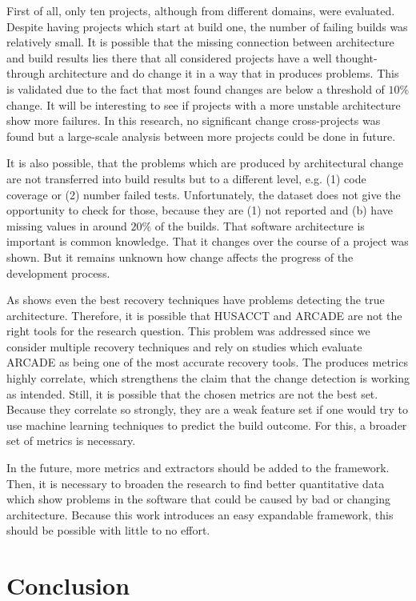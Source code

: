 \documentclass[conference]{IEEEtran}
\begin{document}
First of all, only ten projects, although from different domains, were evaluated. Despite having projects which start at build one, the number of failing builds was relatively small. It is possible that the missing connection between architecture and build results lies there that all considered projects have a well thought-through architecture and do change it in a way that in produces problems. This is validated due to the fact that most found changes are below a threshold of $10\%$ change. It will be interesting to see if projects with a more unstable architecture show more failures. In this research, no significant change cross-projects was found but a large-scale analysis between more projects could be done in future. 

It is also possible, that the problems which are produced by architectural change are not transferred into build results but to a different level, e.g. (1) code coverage or (2) number failed tests. Unfortunately, the dataset does not give the opportunity to check for those, because they are (1) not reported and (b) have missing values in around $20\%$ of the builds. That software architecture is important is common knowledge. That it changes over the course of a project was shown. But it remains unknown how change affects the progress of the development process.

As \cite{arcRec-comparison} shows even the best recovery techniques have problems detecting the true architecture. Therefore, it is possible that HUSACCT and ARCADE are not the right tools for the research question. This problem was addressed since we consider multiple recovery techniques and rely on studies which evaluate ARCADE as being one of the most accurate recovery tools. The produces metrics highly correlate, which strengthens the claim that the change detection is working as intended. Still, it is possible that the chosen metrics are not the best set. Because they correlate so strongly, they are a weak feature set if one would try to use machine learning techniques to predict the build outcome. For this, a broader set of metrics is necessary. 

In the future, more metrics and extractors should be added to the framework. Then, it is necessary to broaden the research to find better quantitative data which show problems in the software that could be caused by bad or changing architecture. Because this work introduces an easy expandable framework, this should be possible with little to no effort.

\section{Conclusion}
\end{document}
